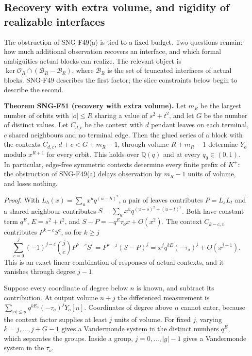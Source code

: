 \documentclass[
  11pt,
  a4paper,
]{report}
\begin{document}
\hypertarget{recovery-with-extra-volume-and-rigidity-of-realizable-interfaces}{%
\subsection{Recovery with extra volume, and rigidity of realizable
interfaces}\label{recovery-with-extra-volume-and-rigidity-of-realizable-interfaces}}

The obstruction of SNG-F49(a) is tied to a fixed budget. Two questions
remain: how much additional observation recovers an interface, and which
formal ambiguities actual blocks can realize. The relevant object is
\(\ker\mathcal O_R\cap(\mathcal B_R-\mathcal B_R)\), where
\(\mathcal B_R\) is the set of truncated interfaces of actual blocks.
SNG-F49 describes the first factor; the slice constraints below begin to
describe the second.

\textbf{Theorem SNG-F51 (recovery with extra volume).} Let \(m_R\) be
the largest number of orbits with \(|o|\le R\) sharing a value of
\(s^2+t^2\), and let \(G\) be the number of distinct values. Let
\(C_{d,c}\) be the context with \(d\) pendant leaves on each terminal,
\(c\) shared neighbours and no terminal edge. Then the glued series of a
block with the contexts \(C_{d,c}\), \(d+c<G+m_R-1\), through volume
\(R+m_R-1\) determine \(Y_o\) modulo \(x^{R+1}\) for every orbit. This
holds over \(\mathbb Q(q)\) and at every \(q_0\in(0,1)\). In particular,
edge-free symmetric contexts determine every finite prefix of \(K^+\):
the obstruction of SNG-F49(a) delays observation by \(m_R-1\) units of
volume, and loses nothing.

\emph{Proof.} With \(L_h(x)=\sum_ux^uq^{(u-h)^2}\), a pair of leaves
contributes \(P=L_sL_t\) and a shared neighbour contributes
\(S=\sum_ux^uq^{(u-s)^2+(u-t)^2}\). Both have constant term \(q^{E}\),
\(E=s^2+t^2\), and \(S-P=-q^E\tau_ox+O(x^2)\). The context \(C_{k-c,c}\)
contributes \(P^{k-c}S^c\), so for \(k\ge j\) \[
\sum_{c=0}^{j}(-1)^{j-c}\binom jc P^{k-c}S^c=P^{k-j}(S-P)^j=x^jq^{kE}(-\tau_o)^j+O(x^{j+1}).
\] This is an exact linear combination of responses of actual contexts,
and it vanishes through degree \(j-1\).

Suppose every coordinate of degree below \(n\) is known, and subtract
its contribution. At output volume \(n+j\) the differenced measurement
is \(\sum_{|o|\le n}q^{kE_o}(-\tau_o)^jY_o[n]\). Coordinates of degree
above \(n\) cannot enter, because the context factor supplies at least
\(j\) units of volume. For fixed \(j\), varying \(k=j,\ldots,j+G-1\)
gives a Vandermonde system in the distinct numbers \(q^E\), which
separates the groups. Inside a group, \(j=0,\ldots,|g|-1\) gives a
Vandermonde system in the \(\tau_o\).
\end{document}
